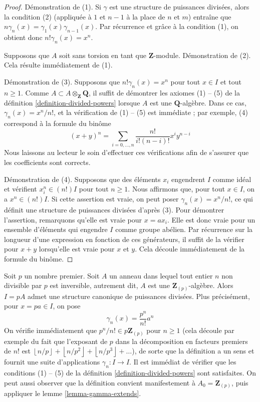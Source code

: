 \begin{proof}
Démonstration de (1). Si $\gamma$ est une structure de puissances divisées, alors la
condition (2) (appliquée à $1$ et $n-1$ à la place de $n$ et $m$)
entraîne que $n \gamma_n(x) = \gamma_1(x)\gamma_{n - 1}(x)$. Par
récurrence et grâce à la condition (1), on obtient donc $n! \gamma_n(x) = x^n$.

\medskip\noindent
Supposons que $A$ soit sans torsion en tant que $\mathbf{Z}$-module.
Démonstration de (2). Cela résulte immédiatement de (1).

\medskip\noindent
Démonstration de (3). Supposons que $n! \gamma_n(x) = x^n$ pour tout $x \in I$ et tout
$n \geq 1$. Comme $A \subset A \otimes_{\mathbf{Z}} \mathbf{Q}$, il suffit
de démontrer les axiomes (1) -- (5) de la définition
\ref{definition-divided-powers} lorsque $A$ est une $\mathbf{Q}$-algèbre.
Dans ce cas, $\gamma_n(x) = x^n/n!$, et la vérification de
(1) -- (5) est immédiate ; par exemple, (4) correspond à la formule du
binôme
$$
(x + y)^n = \sum_{i = 0, \ldots, n} \frac{n!}{i!(n - i)!} x^iy^{n - i}
$$
Nous laissons au lecteur le soin d'effectuer ces
vérifications afin de s'assurer que les coefficients sont corrects.

\medskip\noindent
Démonstration de (4). Supposons que des éléments $x_i$ engendrent $I$ comme idéal
et vérifient $x_i^n \in (n!)I$ pour tout $n \geq 1$. Nous affirmons que,
pour tout $x \in I$, on a $x^n \in (n!)I$. Si cette assertion est vraie,
on peut poser $\gamma_n(x) = x^n/n!$, ce qui définit une structure de puissances divisées d'après
(3). Pour démontrer l'assertion, remarquons qu'elle est vraie pour $x = ax_i$. Elle est
donc vraie pour un ensemble d'éléments qui engendre $I$ comme groupe abélien.
Par récurrence sur la longueur d'une expression en fonction de ces générateurs, il
suffit de la vérifier pour $x + y$ lorsqu'elle est vraie pour $x$ et $y$. Cela
découle immédiatement de la formule du binôme.
\end{proof}

\begin{example}
\label{example-ideal-generated-by-p}
Soit $p$ un nombre premier.
Soit $A$ un anneau dans lequel tout entier $n$ non divisible par $p$
est inversible, autrement dit, $A$ est une $\mathbf{Z}_{(p)}$-algèbre. Alors
$I = pA$ admet une structure canonique de puissances divisées. Plus précisément, pour
$x = pa \in I$, on pose
$$
\gamma_n(x) = \frac{p^n}{n!} a^n
$$
On vérifie immédiatement que $p^n/n! \in p\mathbf{Z}_{(p)}$
pour $n \geq 1$ (cela découle par exemple du fait
que l'exposant de $p$ dans la décomposition en facteurs premiers de $n!$ est
$\left\lfloor n/p \right\rfloor + \left\lfloor n/p^2 \right\rfloor
+ \left\lfloor n/p^3 \right\rfloor + \ldots$),
de sorte que la définition a un sens et fournit une suite
d'applications $\gamma_n : I \to I$. Il est immédiat de vérifier que
les conditions (1) -- (5) de la
définition \ref{definition-divided-powers} sont satisfaites.
On peut aussi observer que la définition convient manifestement à
$A_0 = \mathbf{Z}_{(p)}$, puis appliquer le
lemme \ref{lemma-gamma-extends}.
\end{example}

